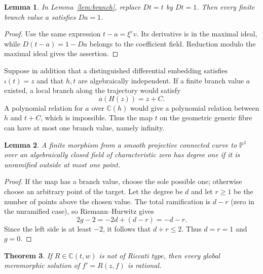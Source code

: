 \documentclass[11pt,reqno]{amsart}
\numberwithin{equation}{section}
\newtheorem{theorem}{Theorem}[section]
\newtheorem{lemma}[theorem]{Lemma}
\theoremstyle{definition}
\theoremstyle{remark}
\newcommand{\C}{\mathbb C}
\newcommand{\PP}{\mathbb P}
\begin{document}
\begin{lemma}
\label{lem:additive-branch}
In Lemma~\ref{lem:branch}, replace $Dt=t$ by $Dt=1$. Then every
finite branch value $a$ satisfies $Da=1$.
\end{lemma}

\begin{proof}
Use the same expression $t-a=\xi^e v$. Its derivative is in the
maximal ideal, while $D(t-a)=1-Da$ belongs to the coefficient field.
Reduction modulo the maximal ideal gives the assertion.
\end{proof}

Suppose in addition that a distinguished differential embedding
satisfies $\iota(t)=z$ and that $h,t$ are algebraically independent.
If a finite branch value $a$ existed, a local branch along the
trajectory would satisfy
\[
 a(H(z))=z+C.
\]
A polynomial relation for $a$ over $\C(h)$ would give a polynomial
relation between $h$ and $t+C$, which is impossible. Thus the map
$t$ on the geometric generic fibre can have at most one branch
value, namely infinity.

\begin{lemma}
\label{lem:one-point}
A finite morphism from a smooth projective connected curve to
$\PP^1$ over an algebraically closed field of characteristic zero
has degree one if it is unramified outside at most one point.
\end{lemma}

\begin{proof}
If the map has a branch value, choose the sole possible one; otherwise
choose an arbitrary point of the target. Let the degree be $d$ and let
$r\geq1$ be the number of points above the chosen value. The total
ramification is $d-r$ (zero in the unramified case), so
Riemann--Hurwitz gives
\[
 2g-2=-2d+(d-r)=-d-r.
\]
Since the left side is at least $-2$, it follows that $d+r\leq2$.
Thus $d=r=1$ and $g=0$.
\end{proof}

\begin{theorem}
\label{thm:additive}
If $R\in\C(t,w)$ is not of Riccati type, then every global
meromorphic solution of $f'=R(z,f)$ is rational.
\end{theorem}
\end{document}
